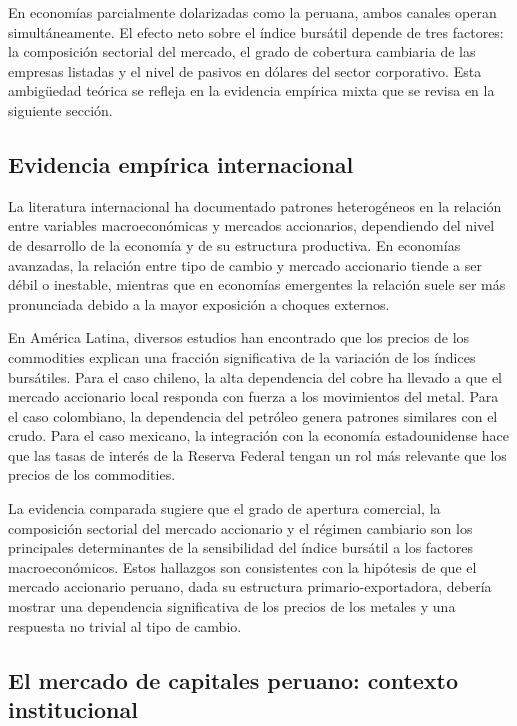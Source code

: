 \documentclass[12pt, a4paper]{article}
\begin{document}
En economías parcialmente dolarizadas como la peruana, ambos canales operan simultáneamente. El efecto neto sobre el índice bursátil depende de tres factores: la composición sectorial del mercado, el grado de cobertura cambiaria de las empresas listadas y el nivel de pasivos en dólares del sector corporativo. Esta ambigüedad teórica se refleja en la evidencia empírica mixta que se revisa en la siguiente sección.

\subsection{Evidencia empírica internacional}

La literatura internacional ha documentado patrones heterogéneos en la relación entre variables macroeconómicas y mercados accionarios, dependiendo del nivel de desarrollo de la economía y de su estructura productiva. En economías avanzadas, la relación entre tipo de cambio y mercado accionario tiende a ser débil o inestable, mientras que en economías emergentes la relación suele ser más pronunciada debido a la mayor exposición a choques externos.

En América Latina, diversos estudios han encontrado que los precios de los commodities explican una fracción significativa de la variación de los índices bursátiles. Para el caso chileno, la alta dependencia del cobre ha llevado a que el mercado accionario local responda con fuerza a los movimientos del metal. Para el caso colombiano, la dependencia del petróleo genera patrones similares con el crudo. Para el caso mexicano, la integración con la economía estadounidense hace que las tasas de interés de la Reserva Federal tengan un rol más relevante que los precios de los commodities.

La evidencia comparada sugiere que el grado de apertura comercial, la composición sectorial del mercado accionario y el régimen cambiario son los principales determinantes de la sensibilidad del índice bursátil a los factores macroeconómicos. Estos hallazgos son consistentes con la hipótesis de que el mercado accionario peruano, dada su estructura primario-exportadora, debería mostrar una dependencia significativa de los precios de los metales y una respuesta no trivial al tipo de cambio.

\subsection{El mercado de capitales peruano: contexto institucional}
\end{document}
